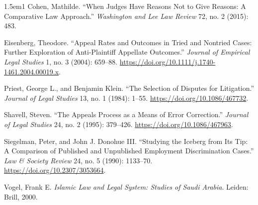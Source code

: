 \documentclass[11pt]{article}
\begin{document}
\begin{hangparas}{1.5em}{1}
Cohen, Mathilde. ``When Judges Have Reasons Not to Give Reasons: A
Comparative Law Approach.'' \emph{Washington and Lee Law Review} 72, no. 2
(2015): 483.

Eisenberg, Theodore. ``Appeal Rates and Outcomes in Tried and Nontried Cases:
Further Exploration of Anti-Plaintiff Appellate Outcomes.'' \emph{Journal of
Empirical Legal Studies} 1, no. 3 (2004): 659--88.
\url{https://doi.org/10.1111/j.1740-1461.2004.00019.x}.

Priest, George L., and Benjamin Klein. ``The Selection of Disputes for
Litigation.'' \emph{Journal of Legal Studies} 13, no. 1 (1984): 1--55.
\url{https://doi.org/10.1086/467732}.

Shavell, Steven. ``The Appeals Process as a Means of Error Correction.''
\emph{Journal of Legal Studies} 24, no. 2 (1995): 379--426.
\url{https://doi.org/10.1086/467963}.

Siegelman, Peter, and John J. Donohue III. ``Studying the Iceberg from Its
Tip: A Comparison of Published and Unpublished Employment Discrimination
Cases.'' \emph{Law \& Society Review} 24, no. 5 (1990): 1133--70.
\url{https://doi.org/10.2307/3053664}.

Vogel, Frank E. \emph{Islamic Law and Legal System: Studies of Saudi Arabia}.
Leiden: Brill, 2000.
\end{hangparas}
\end{document}
